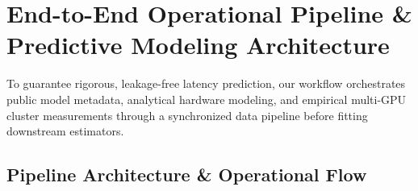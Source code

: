 \documentclass[10pt,a4paper]{article}
\begin{document}
\clearpage

\section*{End-to-End Operational Pipeline \& Predictive Modeling Architecture}
\vspace{-0.2em}
To guarantee rigorous, leakage-free latency prediction, our workflow orchestrates public model metadata, analytical hardware modeling, and empirical multi-GPU cluster measurements through a synchronized data pipeline before fitting downstream estimators.

\vspace{0.1em}
\subsection*{Pipeline Architecture \& Operational Flow}
\vspace{0.1em}
\end{document}
